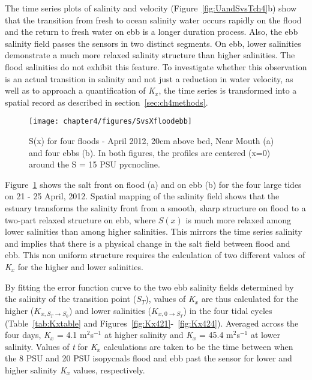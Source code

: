 The time series plots of salinity and velocity (Figure~\ref{fig:UandSvsTch4}b) show that the transition from fresh to ocean salinity water occurs rapidly on the flood and the return to fresh water on ebb is a longer duration process. Also, the ebb salinity field passes the sensors in two distinct segments. On ebb, lower salinities demonstrate a much more relaxed salinity structure than higher salinities. The flood salinities do not exhibit this feature. To investigate whether this observation is an actual transition in salinity and not just a reduction in water velocity, as well as to approach a quantification of \emph{K$_x$}, the time series is transformed into a spatial record as described in section~\ref{sec:ch4methods}. 

\begin{figure}[hp]
	\texttt{[image: chapter4/figures/SvsXfloodebb]} 
\caption{S(x) for four floods - April 2012, 20cm above bed, Near Mouth (a) and four ebbs (b). In both figures, the profiles are centered (x=0) around the S = 15 PSU pycnocline.} \label{fig:SvsXall}
\end{figure}

Figure~\ref{fig:SvsXall} shows the salt front on flood (a) and on ebb (b) for the four large tides on 21 - 25 April, 2012. Spatial mapping of the salinity field shows that the estuary transforms  the salinity front from a smooth, sharp structure on flood to a two-part relaxed structure on ebb, where $S(x)$ is much more relaxed among lower salinities than among higher salinities. This mirrors the time series salinity and implies that there is a physical change in the salt field between flood and ebb. This non uniform structure requires the calculation of two different values of \emph{K$_x$} for the higher and lower salinities.

By fitting the error function curve to the two ebb salinity fields determined by the salinity of the transition point ($S_T$), values of \emph{K$_x$} are thus calculated for the higher ($K_{x,S_T\rightarrow S_0}$) and lower salinities ($K_{x,0\rightarrow S_T}$) in the four tidal cycles (Table~\ref{tab:Kxtable} and Figures~\ref{fig:Kx421}-~\ref{fig:Kx424}). Averaged across the four days, \emph{K$_x$} = 4.1 m$^2$s$^{-1}$ at higher salinity and \emph{K$_x$} = 45.4 m$^2$s$^{-1}$ at lower salinity. Values of \emph{t} for \emph{K$_x$} calculations are taken to be the time between when the 8 PSU and 20 PSU isopycnals flood and ebb past the sensor for lower and higher salinity \emph{K$_x$} values, respectively. 

